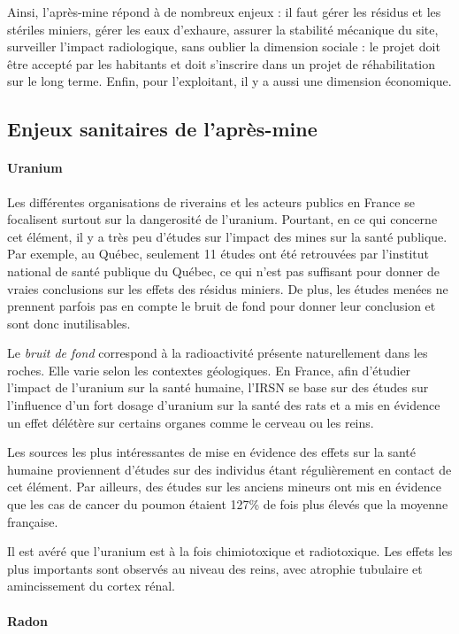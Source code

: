 \documentclass{article}
\begin{document}
Ainsi, l’après-mine répond à de nombreux enjeux : il faut gérer les résidus et les stériles miniers, gérer les eaux d’exhaure, assurer la stabilité mécanique du site, surveiller l’impact radiologique, sans oublier la dimension sociale : le projet doit être accepté par les habitants et doit s’inscrire dans un projet de réhabilitation sur le long terme. Enfin, pour l’exploitant, il y a aussi une dimension économique.

\subsection{Enjeux sanitaires de l’après-mine}
\paragraph{Uranium}

Les différentes organisations de riverains et les acteurs publics en France se focalisent surtout sur la dangerosité de l’uranium. Pourtant, en ce qui concerne cet élément, il y a très peu d'études sur l’impact des mines sur la santé publique. Par exemple, au Québec, seulement 11 études ont été retrouvées par l’institut national de santé publique du Québec, ce qui n’est pas suffisant pour donner de vraies conclusions sur les effets des résidus miniers. De plus, les études menées ne prennent parfois pas en compte le bruit de fond pour donner leur conclusion et sont donc inutilisables. 

Le \emph{bruit de fond} correspond à la radioactivité présente naturellement dans les roches. Elle varie selon les contextes géologiques. En France, afin d’étudier l’impact de l’uranium sur la santé humaine, l’IRSN se base sur des études sur l’influence d’un fort dosage d’uranium sur la santé des rats et a mis en évidence un effet délétère sur certains organes comme le cerveau ou les reins. 


Les sources les plus intéressantes de mise en évidence des effets sur la santé humaine proviennent d'études sur des individus étant régulièrement en contact de cet élément. Par ailleurs, des études sur les anciens mineurs ont mis en évidence que les cas de cancer du poumon étaient 127\% de fois plus élevés que la moyenne française. 

Il est avéré que l'uranium est à la fois chimiotoxique et radiotoxique. Les effets les plus importants sont observés au niveau des reins, avec atrophie tubulaire et amincissement du cortex rénal.

\paragraph{Radon}
\end{document}
